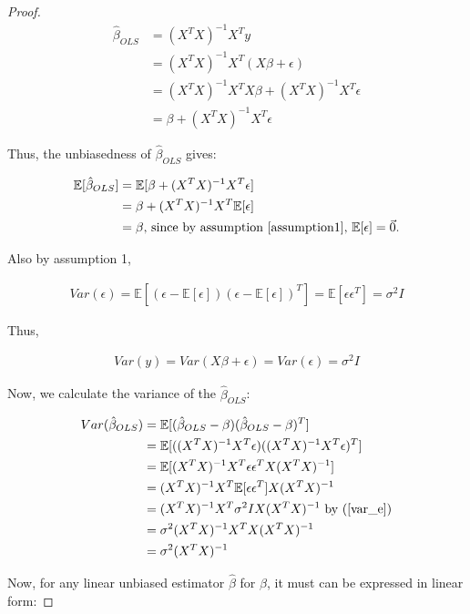 \documentclass[12pt,a4paper]{article}
\begin{document}
\begin{proof}

\begin{align}\hat\beta_{OLS}&=(X^TX)^{-1}X^Ty\\&=(X^TX)^{-1}X^T(X\beta +\epsilon)\\&=(X^TX)^{-1}X^TX\beta+(X^TX)^{-1}X^T\epsilon\\&=\beta+(X^TX)^{-1}X^T\epsilon\end{align}

Thus, the unbiasedness of \(\hat\beta_{OLS}\) gives:

\begin{align}\mathbb{E}[\hat\beta_{OLS}] &= \mathbb{E}[\beta+(X^TX)^{-1}X^T\epsilon]\\&=\beta+(X^TX)^{-1}X^T\mathbb{E}[\epsilon]\\&=\beta\text{, since by assumption \ref{assumption1}, \(\mathbb{E}[\epsilon]=\vec{0}\).}\end{align}

Also by assumption 1,

\begin{align}
\label{var_e}Var(\epsilon)=\mathbb{E}[(\epsilon-\mathbb{E}[\epsilon])(\epsilon-\mathbb{E}[\epsilon])^T]=\mathbb{E}[\epsilon\epsilon^T]=\sigma^2I
\end{align}

Thus,

\begin{align}\label{var_y}Var(y)=Var(X\beta+\epsilon)=Var(\epsilon)=\sigma^2I\end{align}

Now, we calculate the variance of the \(\hat\beta_{OLS}\):

\begin{align}Var(\hat\beta_{OLS})&=\mathbb{E}[(\hat\beta_{OLS}-\beta)(\hat\beta_{OLS}-\beta)^T]\\&=\mathbb{E}[((X^TX)^{-1}X^T\epsilon)((X^TX)^{-1}X^T\epsilon)^T]\\&=\mathbb{E}[(X^TX)^{-1}X^T\epsilon\epsilon^TX(X^TX)^{-1}]\\&=(X^TX)^{-1}X^T\mathbb{E}[\epsilon\epsilon^T]X(X^TX)^{-1}\\&=(X^TX)^{-1}X^T\sigma^2IX(X^TX)^{-1} \text{ by (\ref{var_e})}\\&=\sigma^2(X^TX)^{-1}X^TX(X^TX)^{-1}\\&=\sigma^2(X^TX)^{-1}\end{align}

Now, for any linear unbiased estimator \(\hat\beta\) for \(\beta\), it
must can be expressed in linear form:


\end{proof}
\end{document}

